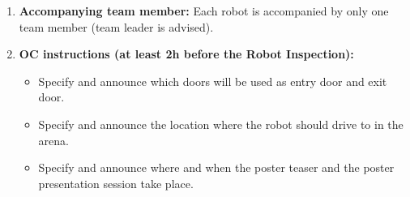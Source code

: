 \begin{enumerate}
	\item \textbf{Accompanying team member:} Each robot is accompanied by only one team member (team leader is advised).
	\item \textbf{OC instructions (at least 2h before the Robot Inspection):}
	\begin{itemize}
		\item Specify and announce which doors will be used as entry door and exit door.
		\item Specify and announce the location where the robot should drive to in the arena.
		\item Specify and announce where and when the poster teaser and the poster presentation session take place.
	\end{itemize}
\end{enumerate}


